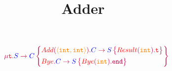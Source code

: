 \documentclass{article}
\title{Adder~\cite{HuHybrid2016}}
\date{}
\newcommand{\tuple}[1]{\langle #1\rangle}
\begin{document}
	\maketitle

	$$
	\gtRec{t}{
		\gtComm{S}{C}{
		{{Add}[\tuple{int, int}]{
				\gtComm{C}{S}{{{Result}[int]{\gtVar{t}}}}
			}}
		{{Bye}{
				\gtComm{C}{S}{{{Bye}[int]{\gtEnd}}}
			}}
		}
	}
	$$

	
	
\end{document}
